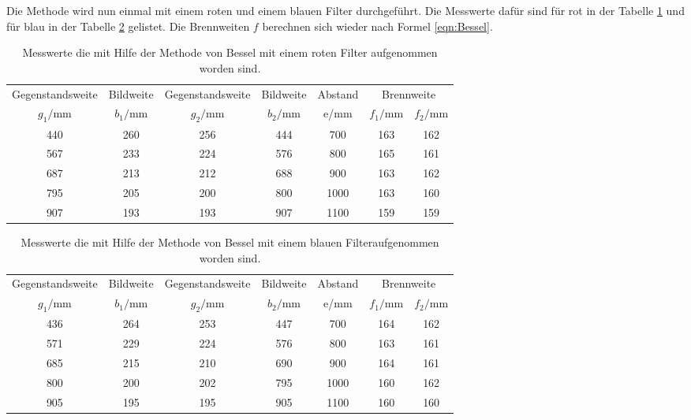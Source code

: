 Die Methode wird nun einmal mit einem  roten und einem blauen Filter durchgeführt.
Die Messwerte dafür sind für rot in der Tabelle \ref{tab:rot} und für blau
in der Tabelle \ref{tab:blau} gelistet.
Die Brennweiten $f$ berechnen sich wieder nach Formel \eqref{eqn:Bessel}.

\begin{table}
    \centering
    \caption{Messwerte die mit Hilfe der Methode von Bessel mit einem roten Filter aufgenommen worden sind.}
    \label{tab:rot}
    \begin{tabular}{c c c c c c c}
    \toprule
    Gegenstandsweite   & Bildweite &  Gegenstandsweite   & Bildweite & Abstand  & \multicolumn{2}{c}{Brennweite}\\
    $g_1/\si{\milli\meter}$ & $b_1/\si{\milli\meter}$ &$g_2/\si{\milli\meter}$ & $b_2/\si{\milli\meter}$ & e/\si{\milli\meter} & $f_1/\si{\milli\meter}$ & $f_2/\si{\milli\meter}$\\
    \midrule
    440 & 260 & 256 & 444 & 700  & 163  & 162 \\
    567 & 233 & 224 & 576 & 800  & 165  & 161 \\
    687 & 213 & 212 & 688 & 900  & 163  & 162 \\
    795 & 205 & 200 & 800 & 1000 & 163  & 160 \\
    907 & 193 & 193 & 907 & 1100 & 159  & 159 \\
    \bottomrule
\end{tabular}
\end{table}
\FloatBarrier

\begin{table}
    \centering
    \caption{Messwerte die mit Hilfe der Methode von Bessel mit einem blauen Filteraufgenommen worden sind.}
    \label{tab:blau}
    \begin{tabular}{c c c c c c c}
    \toprule
    Gegenstandsweite   & Bildweite &  Gegenstandsweite   & Bildweite & Abstand  & \multicolumn{2}{c}{Brennweite}\\
    $g_1/\si{\milli\meter}$ & $b_1/\si{\milli\meter}$ &$g_2/\si{\milli\meter}$ & $b_2/\si{\milli\meter}$ & e/\si{\milli\meter} & $f_1/\si{\milli\meter}$ & $f_2/\si{\milli\meter}$\\
    \midrule
    436  & 264  &  253  &  447  &  700  & 164 & 162 \\
    571  & 229  &  224  &  576  &  800  & 163 & 161 \\
    685  & 215  &  210  &  690  &  900  & 164 & 161 \\
    800  & 200  &  202  &  795  &  1000 & 160 & 162 \\
    905  & 195  &  195  &  905  &  1100 & 160 & 160 \\
    \bottomrule
  \end{tabular}
\end{table}
\FloatBarrier

